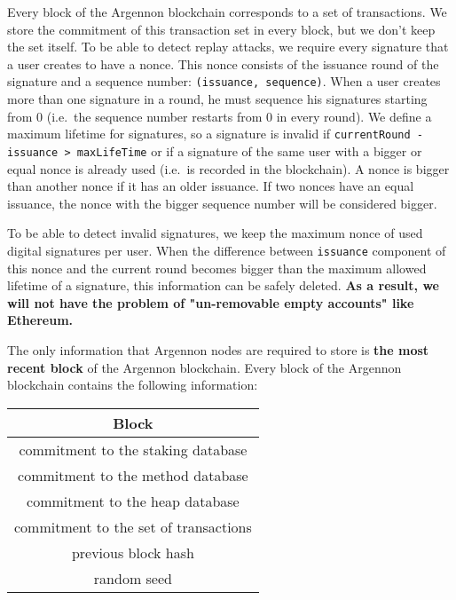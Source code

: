 Every block of the Argennon blockchain corresponds to a set of transactions. We store the commitment of this
transaction set in every block, but we don't keep the set itself. To be able to detect replay attacks, we require
every signature that a user creates to have a nonce. This nonce consists of the issuance round of the signature
and a sequence number: \texttt{(issuance,\ sequence)}. When a user creates more than one signature in a round, he
must sequence his signatures starting from 0 (i.e.~the sequence number restarts from 0 in every round). We define
a maximum lifetime for signatures, so a signature is invalid if \texttt{currentRound - issuance > maxLifeTime} or
if a signature of the same user with a bigger or equal nonce is already used
(i.e.~is recorded in the blockchain). A nonce is bigger than another nonce if it has an older issuance. If two
nonces have an equal issuance, the nonce with the bigger sequence number will be considered bigger.

To be able to detect invalid signatures, we keep the maximum nonce of used digital signatures per user. When the
difference between \texttt{issuance} component of this nonce and the current round becomes bigger than the
maximum allowed lifetime of a signature, this information can be safely deleted. \textbf{As a result, we will not
have the problem of "un-removable empty accounts" like Ethereum.}

The only information that Argennon nodes are required to store is \textbf{the most recent block} of the Argennon
blockchain. Every block of the Argennon blockchain contains the following information:

\begin{center}
    \begin{tabular}{||c||}
        \hline
        \textbf{Block} \\ [0.5ex]
        \hline\hline
        commitment to the staking database \\ [0.7ex]
        commitment to the method database \\ [0.7ex]
        commitment to the heap database \\ [0.7ex]
        commitment to the set of transactions       \\ [0.7ex]
        previous block hash                         \\ [0.7ex]
        random seed                                 \\ [0.7ex]
        \hline
    \end{tabular}
\end{center}

